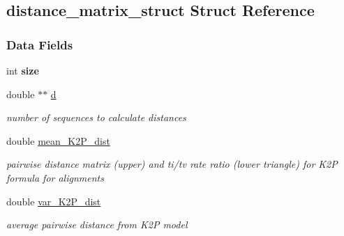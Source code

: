 \hypertarget{structdistance__matrix__struct}{}\subsection{distance\+\_\+matrix\+\_\+struct Struct Reference}
\label{structdistance__matrix__struct}
\subsubsection*{Data Fields}
\begin{DoxyCompactItemize}
\item 
\mbox{\label{structdistance__matrix__struct_ae3bda587ffbddb74a172950bc8f8e7dc}} 
int {\bfseries size}
\item 
\mbox{\label{structdistance__matrix__struct_a1ff58ccc6db95e89dd75b507f861f831}} 
double $\ast$$\ast$ \hyperlink{structdistance__matrix__struct_a1ff58ccc6db95e89dd75b507f861f831}{d}
\begin{DoxyCompactList}\small\item\em number of sequences to calculate distances \end{DoxyCompactList}\item 
\mbox{\label{structdistance__matrix__struct_afc4f6b1f99853775e6845a199a76b87d}} 
double \hyperlink{structdistance__matrix__struct_afc4f6b1f99853775e6845a199a76b87d}{mean\+\_\+\+K2\+P\+\_\+dist}
\begin{DoxyCompactList}\small\item\em pairwise distance matrix (upper) and ti/tv rate ratio (lower triangle) for K2P formula for alignments \end{DoxyCompactList}\item 
\mbox{\label{structdistance__matrix__struct_aeef427ffb5649a9e6e700ce442822a2f}} 
double \hyperlink{structdistance__matrix__struct_aeef427ffb5649a9e6e700ce442822a2f}{var\+\_\+\+K2\+P\+\_\+dist}
\begin{DoxyCompactList}\small\item\em average pairwise distance from K2P model \end{DoxyCompactList}\item 
\mbox{\label{structdistance__matrix__struct_a6fb67c32cbdaf1491c48c4184ac28f4a}} 
$$
\end{DoxyCompactItemize}
